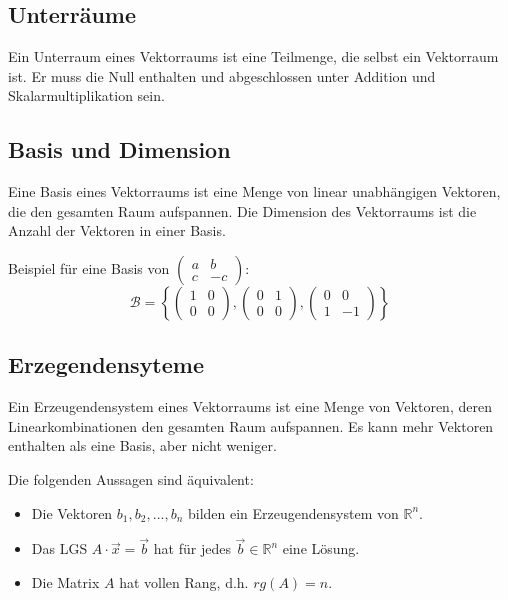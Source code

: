 \documentclass{article}
\begin{document}
\begin{minipage}[t]{0.45\textwidth}
    \subsection*{Unterräume}
    Ein Unterraum eines Vektorraums ist eine Teilmenge, die selbst ein Vektorraum ist. Er muss die Null enthalten und abgeschlossen unter Addition und Skalarmultiplikation sein.
    
    \subsection*{Basis und Dimension}
    Eine Basis eines Vektorraums ist eine Menge von linear unabhängigen Vektoren, die den gesamten Raum aufspannen. Die Dimension des Vektorraums ist die Anzahl der Vektoren in einer Basis.

    Beispiel für eine Basis von $\begin{pmatrix}
        a & b \\
        c & -c
    \end{pmatrix}$:
    \begin{equation*}
        \mathcal{B} = \left\{ \begin{pmatrix}
        1 & 0 \\
        0 & 0
        \end{pmatrix}, \begin{pmatrix}
        0 & 1 \\
        0 & 0
        \end{pmatrix}, \begin{pmatrix}
        0 & 0 \\
        1 & -1
        \end{pmatrix} \right\}
    \end{equation*}

    \subsection*{Erzegendensyteme}
    Ein Erzeugendensystem eines Vektorraums ist eine Menge von Vektoren, deren Linearkombinationen den gesamten Raum aufspannen. Es kann mehr Vektoren enthalten als eine Basis, aber nicht weniger.
    
    Die folgenden Aussagen sind äquivalent:
    \begin{itemize}
        \item Die Vektoren $b_1, b_2, \ldots, b_n$ bilden ein Erzeugendensystem von $\mathbb{R}^n$.
        \item Das LGS $A \cdot \vec{x} = \vec{b}$ hat für jedes $\vec{b} \in \mathbb{R}^n$ eine Lösung.
        \item Die Matrix $A$ hat vollen Rang, d.h. $rg(A) = n$.
    \end{itemize}


\end{minipage}
\end{document}
